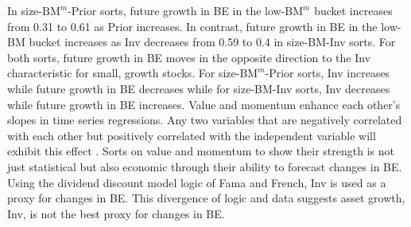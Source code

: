 In size-$\text{BM}^m$-Prior sorts, future growth in BE in the low-$\text{BM}^m$
bucket increases from 0.31 to 0.61 as Prior increases.
In contrast, future growth in BE in the low-BM bucket increases as Inv
decreases from 0.59 to 0.4 in size-BM-Inv sorts.
For both sorts, future growth in BE moves in the opposite direction to the
Inv characteristic for small, growth stocks.
For size-$\text{BM}^m$-Prior sorts, Inv increases while future growth in BE
decreases while for size-BM-Inv sorts, Inv decreases while future growth in
BE increases.
Value and momentum enhance each other's slopes in time series regressions.
Any two variables that are negatively correlated with each other but positively
correlated with the independent variable will exhibit this effect
\parencite{fama2015incremental}.
Sorts on value and momentum to show their strength is not just
statistical but also economic through their ability to forecast changes in BE.
Using the dividend discount model logic of Fama and French,
Inv is used as a proxy for changes in BE.
This divergence of logic and data suggests asset growth, Inv,
is not the best proxy for changes in BE.

